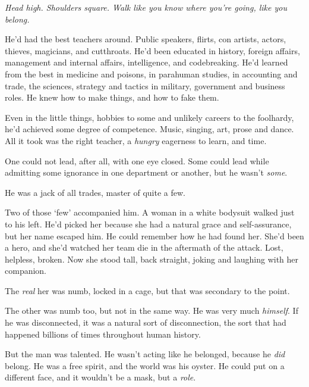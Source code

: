 





\emph{Head high.  Shoulders square.  Walk like you know where you're going, like you belong.}



He'd had the best teachers around.  Public speakers, flirts, con artists, actors, thieves, magicians, and cutthroats.  He'd been educated in history, foreign affairs, management and internal affairs, intelligence, and codebreaking.  He'd learned from the best in medicine and poisons, in parahuman studies, in accounting and trade, the sciences, strategy and tactics in military, government and business roles.  He knew how to make things, and how to fake them.



Even in the little things, hobbies to some and unlikely careers to the foolhardy, he'd achieved some degree of competence.  Music, singing, art, prose and dance.  All it took was the right teacher, a \emph{hungry} eagerness to learn, and time.



One could not lead, after all, with one eye closed.  Some could lead while admitting some ignorance in one department or another, but he wasn't \emph{some}.



He was a jack of all trades, master of quite a few.



Two of those `few' accompanied him.  A woman in a white bodysuit walked just to his left.  He'd picked her because she had a natural grace and self-assurance, but her name escaped him.  He could remember how he had found her.  She'd been a hero, and she'd watched her team die in the aftermath of the attack.  Lost, helpless, broken.  Now she stood tall, back straight, joking and laughing with her companion.



The \emph{real} her was numb, locked in a cage, but that was secondary to the point.



The other was numb too, but not in the same way.  He was very much \emph{himself}.  If he was disconnected, it was a natural sort of disconnection, the sort that had happened billions of times throughout human history.



But the man was talented.  He wasn't acting like he belonged, because he \emph{did} belong.  He was a free spirit, and the world was his oyster.  He could put on a different face, and it wouldn't be a mask, but a \emph{role}.



